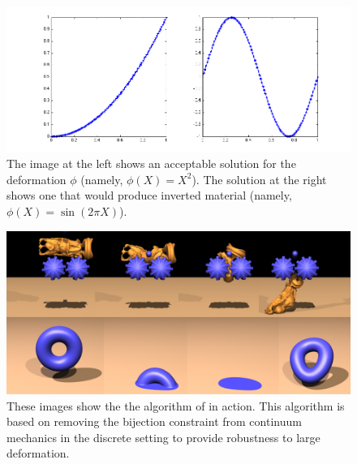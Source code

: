 \begin{figure}
\includegraphics[width=\textwidth]{images/elasticity_1d}
\caption{The image at the left shows an acceptable solution for the deformation $\phi$ (namely, $\phi(X) = X^2$). The solution at the right shows one that would produce inverted material (namely, $\phi(X) = \sin \left( 2 \pi X \right)$).}
\label{fig:inversion}
\end{figure}

\begin{figure}
\includegraphics[width=\textwidth]{images/buddha_gears}
\caption{These images show the the algorithm of \cite{Irving06} in action. This algorithm is based on removing the bijection constraint from continuum mechanics in the discrete setting to provide robustness to large deformation.}
\label{fig:inversion2}
\end{figure}


